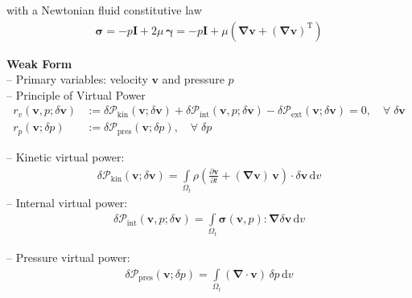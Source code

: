 \documentclass[a4paper,12pt]{report}
\newcommand{\bs}[1]{\boldsymbol{#1}}
\newcommand{\Om}{\mathit{\Omega}}
\begin{document}
with a Newtonian fluid constitutive law
\begin{align}
\bs{\sigma} = -p \bs{I} + 2 \mu\,\bs{\gamma} = -p \bs{I} + \mu \left(\bs{\nabla} \bs{v} + (\bs{\nabla} \bs{v})^{\mathrm{T}}\right)
\end{align}

\textbf{Weak Form}\\

-- Primary variables: velocity $\bs{v}$ and pressure $p$\\

-- Principle of Virtual Power
\begin{equation}
\label{equation-fluid-weak-form}
\begin{aligned}
r_v(\bs{v},p;\delta\bs{v}) &:= \delta \mathcal{P}_{\mathrm{kin}}(\bs{v};\delta\bs{v}) + \delta \mathcal{P}_{\mathrm{int}}(\bs{v},p;\delta\bs{v}) - \delta \mathcal{P}_{\mathrm{ext}}(\bs{v};\delta\bs{v}) = 0, \quad \forall \; \delta\bs{v} \\
r_p(\bs{v};\delta p) &:= \delta \mathcal{P}_{\mathrm{pres}}(\bs{v};\delta p), \quad \forall \; \delta p
\end{aligned}
\end{equation}

-- Kinetic virtual power:
\begin{equation}
\label{equation-deltap-kin}
\begin{aligned}
\delta \mathcal{P}_{\mathrm{kin}}(\bs{v};\delta\bs{v}) = \int\limits_{\Om_t} \rho\left(\frac{\partial\bs{v}}{\partial t} + (\bs{\nabla}\bs{v})\,\bs{v}\right) \cdot \delta\bs{v} \,\mathrm{d}v
\end{aligned}
\end{equation}
-- Internal virtual power:
\begin{equation}
\label{equation-deltap-int}
\begin{aligned}
\delta \mathcal{P}_{\mathrm{int}}(\bs{v},p;\delta\bs{v}) = 
\int\limits_{\Om_t} \bs{\sigma}(\bs{v},p) : \bs{\nabla} \delta\bs{v} \,\mathrm{d}v 
\end{aligned}
\end{equation}

-- Pressure virtual power:
\begin{equation}
\label{equation-deltap-p}
\begin{aligned}
\delta \mathcal{P}_{\mathrm{pres}}(\bs{v};\delta p) = 
\int\limits_{\Om_t} (\bs{\nabla}\cdot\bs{v})\,\delta p\,\mathrm{d}v
\end{aligned}
\end{equation}
\end{document}
